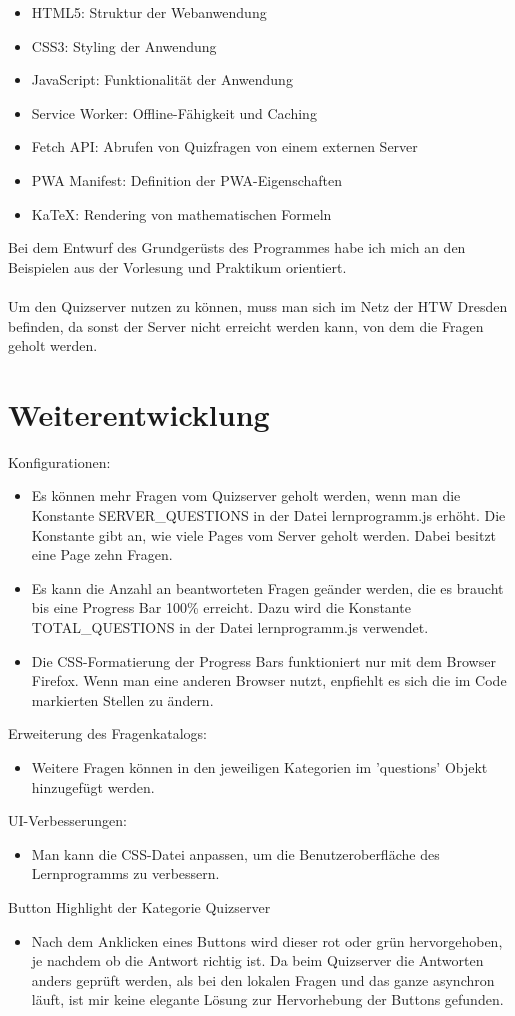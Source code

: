 \documentclass{article}
\begin{document}
\begin{itemize}
  \item HTML5: Struktur der Webanwendung
  \item CSS3: Styling der Anwendung
  \item JavaScript: Funktionalität der Anwendung
  \item Service Worker: Offline-Fähigkeit und Caching
  \item Fetch API: Abrufen von Quizfragen von einem externen Server
  \item PWA Manifest: Definition der PWA-Eigenschaften
  \item KaTeX: Rendering von mathematischen Formeln
\end{itemize}
Bei dem Entwurf des Grundgerüsts des Programmes habe ich mich an den Beispielen aus der Vorlesung und Praktikum orientiert.\\\\
Um den Quizserver nutzen zu können, muss man sich im Netz der HTW Dresden befinden, da sonst der Server nicht erreicht werden
kann, von dem die Fragen geholt werden.

\section{Weiterentwicklung}
Konfigurationen:
\begin{itemize}
  \item Es können mehr Fragen vom Quizserver geholt werden, wenn man die Konstante SERVER\_QUESTIONS in der Datei lernprogramm.js erhöht.
  Die Konstante gibt an, wie viele Pages vom Server geholt werden. Dabei besitzt eine Page zehn Fragen.
  \item Es kann die Anzahl an beantworteten Fragen geänder werden, die es braucht bis eine Progress Bar 100\% erreicht. Dazu wird die Konstante
  TOTAL\_QUESTIONS in der Datei lernprogramm.js verwendet.
  \item Die CSS-Formatierung der Progress Bars funktioniert nur mit dem Browser Firefox. Wenn man eine anderen Browser nutzt, enpfiehlt es sich
  die im Code markierten Stellen zu ändern.
\end{itemize}
Erweiterung des Fragenkatalogs:
\begin{itemize}
  \item Weitere Fragen können in den jeweiligen Kategorien im 'questions' Objekt hinzugefügt werden.
\end{itemize}
UI-Verbesserungen:
\begin{itemize}
  \item Man kann die CSS-Datei anpassen, um die Benutzeroberfläche des Lernprogramms zu verbessern.
\end{itemize}
Button Highlight der Kategorie Quizserver
\begin{itemize}
  \item Nach dem Anklicken eines Buttons wird dieser rot oder grün hervorgehoben, je nachdem ob die Antwort richtig ist. Da beim Quizserver die Antworten
  anders geprüft werden, als bei den lokalen Fragen und das ganze asynchron läuft, ist mir keine elegante Lösung zur Hervorhebung der Buttons gefunden.
\end{itemize}
\end{document}
